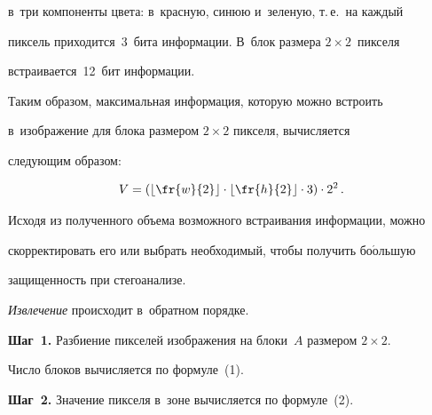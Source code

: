 в~три компоненты цвета: в~красную, синюю и~зеленую, т.\,е.\ на каждый 


пиксель приходится~3~бита информации. В~блок размера $2\times2$~пикселя 


встраивается~12~бит информации. 


  


  \smallskip


  


  


  Таким образом, максимальная информация, которую можно встроить 


в~изоб\-ра\-же\-ние для блока размером $2\times2$ пикселя, вычисляется 


следующим образом: 


  \begin{equation*}


  V=\left( \left\lfloor \fr{w}{2}\right\rfloor \cdot \left\lfloor \fr{h}{2}\right\rfloor 


\cdot 3\right) \cdot 2^2\,.


  \end{equation*}


  


  Исходя из полученного объема возможного встраивания информации, можно 


скорректировать его или выбрать необходимый, чтобы получить бо$\acute{\mbox{о}}$льшую 


защищенность при стегоанализе. 


  


  \smallskip


  


  


  \textit{Извлечение} происходит в~обратном порядке.


  


  \smallskip


  


  


  \textbf{Шаг~1.} Разбиение пикселей изображения на блоки~$A$ размером $2\times2$. 


Число блоков вычисляется по формуле~(1).


  


 \textbf{Шаг~2.} Значение пикселя в~зоне вычисляется по формуле~(2).


